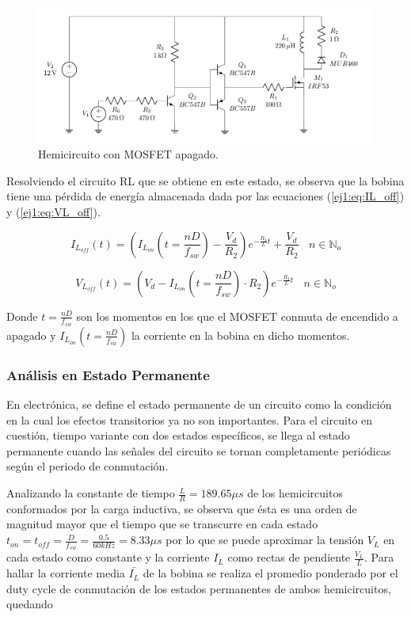 \begin{figure}[H]
	\centering
	\includegraphics[width=0.4\linewidth, page=2]{ImagenesEjercicio-1/CircuitsEj1}
	\caption{Hemicircuito con MOSFET apagado.}
	\label{ej1:fig:circuito_off}
\end{figure}

Resolviendo el circuito RL que se obtiene en este estado, se observa que la bobina tiene una pérdida de energía almacenada dada por las ecuaciones (\ref{ej1:eq:IL_off}) y (\ref{ej1:eq:VL_off}).

\begin{equation}
	 I_{L_{off}}(t) = \left( I_{L_{on}}\left(t= \frac{nD}{f_{sw}}\right) -\frac{V_d}{R_2}\right) e^{-\frac{R_2}{L}t} + \frac{V_d}{R_2} \ \ \ \ n \in \mathbb{N}_o
\label{ej1:eq:IL_off}
\end{equation}

\begin{equation}
	 V_{L_{off}}(t) = \left( V_d - I_{L_{on}}\left(t= \frac{nD}{f_{sw}}\right)\cdot R_2 \right)e^{-\frac{R_2}{L}t} \ \ \ \ n \in \mathbb{N}_o
\label{ej1:eq:VL_off}
\end{equation}

Donde $t=\frac{nD}{f_{sw}}$ son los momentos en los que el MOSFET conmuta de encendido a apagado y $I_{L_{on}}\left(t= \frac{nD}{f_{sw}}\right)$ la corriente en la bobina en dicho momentos. 

\subsubsection{Análisis en Estado Permanente}

En electrónica, se define el estado permanente de un circuito como la condición en la cual los efectos transitorios ya no son importantes. Para el circuito en cuestión, tiempo variante con dos estados específicos, se llega al estado permanente cuando las señales del circuito se tornan completamente periódicas según el periodo de conmutación. 

Analizando la constante de tiempo $\frac{L}{R} = 189.65\mu s$ de los hemicircuitos conformados por la carga inductiva, se observa que ésta es una orden de magnitud mayor que el tiempo que se transcurre en cada estado $t_{on} = t_{off} = \frac{D}{f_{sw}} = \frac{0.5}{60kHz} = 8.33\mu s$ por lo que se puede aproximar la tensión $V_L$ en cada estado como constante y la corriente $I_L$ como rectas de pendiente $\frac{V_L}{L}$. Para hallar la corriente media $\bar{I_L}$ de la bobina se realiza el promedio ponderado por el duty cycle de conmutación de los estados permanentes de ambos hemicircuitos, quedando

